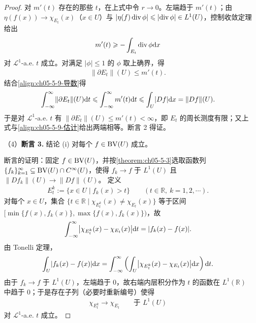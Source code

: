 \documentclass[../../main.tex]{subfiles}%
\begin{document}
\begin{proof}
对 $m'(t)$ 存在的那些 $t$，在上式中令 $r\to0$。左端趋于 $m'(t)$；由 $\eta(f(x))\to\chi_{E_t}(x)$（$x\in U$）与 $\lvert\eta(f)\operatorname{div}\phi\rvert\leqslant\lvert\operatorname{div}\phi\rvert\in L^1(U)$，控制收敛定理给出
\begin{align*}
m'(t)\geqslant-\int_{E_t}\operatorname{div}\phi\mathrm{d} x
\end{align*}
对 $\mathcal{L}^1$-a.e. $t$ 成立。对满足 $\lvert\phi\rvert\leqslant1$ 的 $\phi$ 取上确界，得
\begin{align*}
\lVert\partial E_t\rVert(U)\leqslant m'(t).
\end{align*}
结合\eqref{align:ch05-5-9-导数}得%
\begin{align*}
\int_{-\infty}^{\infty}\lVert\partial E_t\rVert(U)\mathrm{d} t\leqslant\int_{-\infty}^{\infty}m'(t)\mathrm{d} t\leqslant\int_U\lvert Df\rvert\mathrm{d} x=\lVert Df\rVert(U).
\end{align*}
于是对 $\mathcal{L}^1$-a.e. $t$ 有 $\lVert\partial E_t\rVert(U)\leqslant m'(t)<\infty$，即 $E_t$ 的周长测度有限；又上式与\eqref{align:ch05-5-9-估计}给出两端相等。断言 2 得证。%

（4）\textbf{断言 3.} 结论 (i) 对每个 $f\in\mathrm{BV}(U)$ 成立。

断言的证明：固定 $f\in\mathrm{BV}(U)$，并按\cref{theorem:ch05-5-3}选取函数列 $\{f_k\}_{k=1}^{\infty}\subseteq\mathrm{BV}(U)\cap C^{\infty}(U)$，使得 $f_k\to f$ 于 $L^1(U)$ 且 $\lVert Df_k\rVert(U)\to\lVert Df\rVert(U)$。%
定义
\begin{align*}
E_t^k:=\{x\in U\mid f_k(x)>t\}\qquad(t\in\mathbb{R},\ k=1,2,\cdots).
\end{align*}
对每个 $x\in U$，集合 $\{t\in\mathbb{R}\mid\chi_{E_t^k}(x)\neq\chi_{E_t}(x)\}$ 等于区间 $[\min\{f(x),f_k(x)\},\max\{f(x),f_k(x)\})$，故
\begin{align*}
\int_{-\infty}^{\infty}\bigl\lvert\chi_{E_t^k}(x)-\chi_{E_t}(x)\bigr\rvert\mathrm{d} t=\lvert f_k(x)-f(x)\rvert.
\end{align*}
由 Tonelli 定理，
\begin{align*}
\int_U\lvert f_k(x)-f(x)\rvert\mathrm{d} x=\int_{-\infty}^{\infty}\left(\int_U\bigl\lvert\chi_{E_t^k}(x)-\chi_{E_t}(x)\bigr\rvert\mathrm{d} x\right)\mathrm{d} t.
\end{align*}
由于 $f_k\to f$ 于 $L^1(U)$，左端趋于 $0$，故右端内层积分作为 $t$ 的函数在 $L^1(\mathbb{R})$ 中趋于 $0$；于是存在子列（必要时重新编号）使得
\begin{align*}
\chi_{E_t^k}\to\chi_{E_t}\qquad\text{于 }L^1(U)
\end{align*}
对 $\mathcal{L}^1$-a.e. $t$ 成立。


\end{proof}
\end{document}
